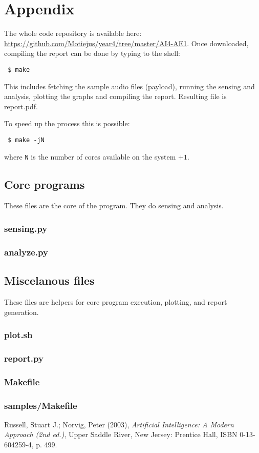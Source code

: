\documentclass[english,11pt]{article}
\numberwithin{equation}{section}
\newcommand{\listing}[1]{
    \subsubsection{#1}
    \label{lst:#1}
    {\small }
}
\begin{document}
\section{Appendix}

The whole code repository is available here:
\url{https://github.com/Motiejus/year4/tree/master/AI4-AE1}. Once downloaded,
compiling the report can be done by typing to the shell:

\texttt {
   \$ make
}

This includes fetching the sample audio files (payload), running the sensing
and analysis, plotting the graphs and compiling the report. Resulting file is
report.pdf.

To speed up the process this is possible:

\texttt {
    \$ make -jN
}

where \texttt{N} is the number of cores available on the system $+1$.

\subsection{Core programs}
These files are the core of the program. They do sensing and analysis.

\listing{sensing.py}
\listing{analyze.py}

\subsection{Miscelanous files}

These files are helpers for core program execution, plotting, and report
generation.

\listing{plot.sh}
\listing{report.py}
\listing{Makefile}
\listing{samples/Makefile}

\clearpage
\begin{thebibliography}{9}

        Russell, Stuart J.; Norvig, Peter (2003),
        \emph{Artificial Intelligence: A Modern Approach (2nd ed.)},
        Upper Saddle River, New Jersey: Prentice Hall,
        ISBN 0-13-604259-4, p. 499.

\end{thebibliography}
\end{document}
